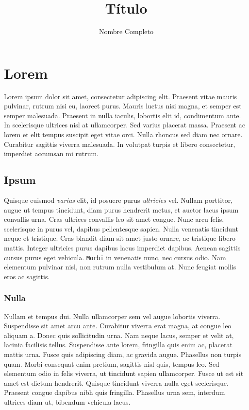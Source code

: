\documentclass[a4paper,12pt]{article}
\title{Título}
\author{Nombre Completo}
\date{}
\begin{document}


\renewcommand{\contentsname}{\centering Índice}
\tableofcontents
\newpage


\section{Lorem}

Lorem ipsum dolor sit amet, consectetur adipiscing elit. Praesent vitae mauris pulvinar, rutrum nisi eu, laoreet purus. Mauris luctus nisi magna, et semper est semper malesuada. Praesent in nulla iaculis, lobortis elit id, condimentum ante. In scelerisque ultrices nisl at ullamcorper. Sed varius placerat massa. Praesent ac lorem et elit tempus suscipit eget vitae orci. Nulla rhoncus sed diam nec ornare. Curabitur sagittis viverra malesuada. In volutpat turpis et libero consectetur, imperdiet accumsan mi rutrum.

\subsection{Ipsum}
Quisque euismod \emph{varius} elit, id posuere purus \emph{ultricies} vel. Nullam porttitor, augue ut tempus tincidunt, diam purus hendrerit metus, et auctor lacus ipsum convallis urna. Cras ultrices convallis leo sit amet congue. Nunc arcu felis, scelerisque in purus vel, dapibus pellentesque sapien. Nulla venenatis tincidunt neque et tristique. Cras blandit diam sit amet justo ornare, ac tristique libero mattis. Integer ultricies purus dapibus lacus imperdiet dapibus. Aenean sagittis cursus purus eget vehicula. \texttt{Morbi} in venenatis nunc, nec cursus odio. Nam elementum pulvinar nisl, non rutrum nulla vestibulum at. Nunc feugiat mollis eros ac sagittis.

\subsubsection*{Nulla}
Nullam et tempus dui. Nulla ullamcorper sem vel augue lobortis viverra. Suspendisse sit amet arcu ante. Curabitur viverra erat magna, at congue leo aliquam a. Donec quis sollicitudin urna. Nam neque lacus, semper et velit at, lacinia facilisis tellus. Suspendisse ante lorem, fringilla quis enim ac, placerat mattis urna. Fusce quis adipiscing diam, ac gravida augue. Phasellus non turpis quam. Morbi consequat enim pretium, sagittis nisl quis, tempus leo. Sed elementum odio in felis viverra, ut tincidunt sapien ullamcorper. Fusce ut est sit amet est dictum hendrerit. Quisque tincidunt viverra nulla eget scelerisque. Praesent congue dapibus nibh quis fringilla. Phasellus urna sem, interdum ultrices diam ut, bibendum vehicula lacus.
\end{document}
